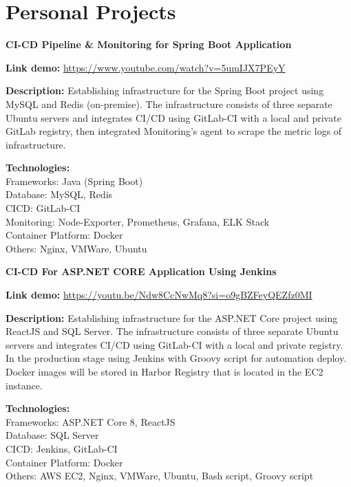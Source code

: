 \documentclass[letterpaper,10pt]{article}
\newcommand{\heading}[2]{
  \hspace{10pt}#1\hfill#2\\
}
\newcommand{\headingBf}[2]{
  \heading{\textbf{#1}}{\textbf{#2}}
}
\newenvironment{resume_list}{
  \vspace{-7pt}
  \begin{itemize}[itemsep=-2px, parsep=1pt, leftmargin=30pt]
}{
  \end{itemize}
}
\begin{document}
\section{Personal Projects}

\headingBf{CI-CD Pipeline \& Monitoring for Spring Boot Application}{}
\begin{resume_list}
    \item \textbf{Link demo:} \href{https://www.youtube.com/watch?v=5umIJX7PEyY}{https://www.youtube.com/watch?v=5umIJX7PEyY}
    \item \textbf{Description:} 
    Establishing infrastructure for the Spring Boot project using MySQL and Redis (on-premise). The infrastructure consists of three separate Ubuntu servers and integrates CI/CD using GitLab-CI with a local and private GitLab registry, then integrated Monitoring's agent to scrape the metric logs of infrastructure.
    \item \textbf{Technologies:} \\
    Frameworks: Java (Spring Boot) \\
    Database: MySQL, Redis \\
    CICD: GitLab-CI \\
    Monitoring: Node-Exporter, Prometheus, Grafana, ELK Stack \\
    Container Platform: Docker \\
    Others: Nginx, VMWare, Ubuntu
\end{resume_list}

\headingBf{CI-CD For ASP.NET CORE Application Using Jenkins}{}
\begin{resume_list}
    \item \textbf{Link demo:} \href{https://youtu.be/Ndw8CcNwMq8?si=o9gBZFeyQEZfz0MI}{https://youtu.be/Ndw8CcNwMq8?si=o9gBZFeyQEZfz0MI}
    \item \textbf{Description:} 
    Establishing infrastructure for the ASP.NET Core project using ReactJS and SQL Server. The infrastructure consists of three separate Ubuntu servers and integrates CI/CD using GitLab-CI with a local and private registry. In the production stage using Jenkins with Groovy script for automation deploy. Docker images will be stored in Harbor Registry that is located in the EC2 instance.
    \item \textbf{Technologies:} \\
    Frameworks: ASP.NET Core 8, ReactJS \\
    Database: SQL Server \\
    CICD: Jenkins, GitLab-CI \\
    Container Platform: Docker \\
    Others: AWS EC2, Nginx, VMWare, Ubuntu, Bash script, Groovy script
\end{resume_list}
\end{document}
